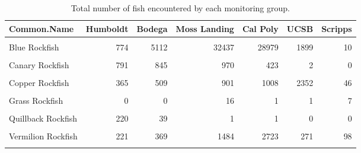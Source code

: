\documentclass[
]{article}
\begin{document}
\begin{table}

\caption{\label{tab:totalfishbygroup}Total number of fish encountered by each monitoring group.}
\centering
\begin{tabular}[t]{lrrrrrr}
\toprule
Common.Name & Humboldt & Bodega & Moss Landing & Cal Poly & UCSB & Scripps\\
\midrule
\cellcolor{gray!6}{Black Rockfish} & \cellcolor{gray!6}{1296} & \cellcolor{gray!6}{1488} & \cellcolor{gray!6}{13272} & \cellcolor{gray!6}{1744} & \cellcolor{gray!6}{2} & \cellcolor{gray!6}{0}\\
Blue Rockfish & 774 & 5112 & 32437 & 28979 & 1899 & 10\\
\cellcolor{gray!6}{Brown Rockfish} & \cellcolor{gray!6}{15} & \cellcolor{gray!6}{749} & \cellcolor{gray!6}{563} & \cellcolor{gray!6}{228} & \cellcolor{gray!6}{25} & \cellcolor{gray!6}{51}\\
Canary Rockfish & 791 & 845 & 970 & 423 & 2 & 0\\
\cellcolor{gray!6}{China Rockfish} & \cellcolor{gray!6}{164} & \cellcolor{gray!6}{495} & \cellcolor{gray!6}{1023} & \cellcolor{gray!6}{112} & \cellcolor{gray!6}{0} & \cellcolor{gray!6}{0}\\
\addlinespace
Copper Rockfish & 365 & 509 & 901 & 1008 & 2352 & 46\\
\cellcolor{gray!6}{Deacon Rockfish} & \cellcolor{gray!6}{1003} & \cellcolor{gray!6}{4895} & \cellcolor{gray!6}{2337} & \cellcolor{gray!6}{343} & \cellcolor{gray!6}{0} & \cellcolor{gray!6}{0}\\
Grass Rockfish & 0 & 0 & 16 & 1 & 1 & 7\\
\cellcolor{gray!6}{Olive Rockfish} & \cellcolor{gray!6}{111} & \cellcolor{gray!6}{701} & \cellcolor{gray!6}{4411} & \cellcolor{gray!6}{4229} & \cellcolor{gray!6}{63} & \cellcolor{gray!6}{74}\\
Quillback Rockfish & 220 & 39 & 1 & 1 & 0 & 0\\
\addlinespace
\cellcolor{gray!6}{Treefish} & \cellcolor{gray!6}{0} & \cellcolor{gray!6}{0} & \cellcolor{gray!6}{35} & \cellcolor{gray!6}{197} & \cellcolor{gray!6}{137} & \cellcolor{gray!6}{139}\\
Vermilion Rockfish & 221 & 369 & 1484 & 2723 & 271 & 98\\
\cellcolor{gray!6}{Yellowtail Rockfish} & \cellcolor{gray!6}{482} & \cellcolor{gray!6}{979} & \cellcolor{gray!6}{1828} & \cellcolor{gray!6}{1029} & \cellcolor{gray!6}{6} & \cellcolor{gray!6}{0}\\
\bottomrule
\end{tabular}
\end{table}
\end{document}
